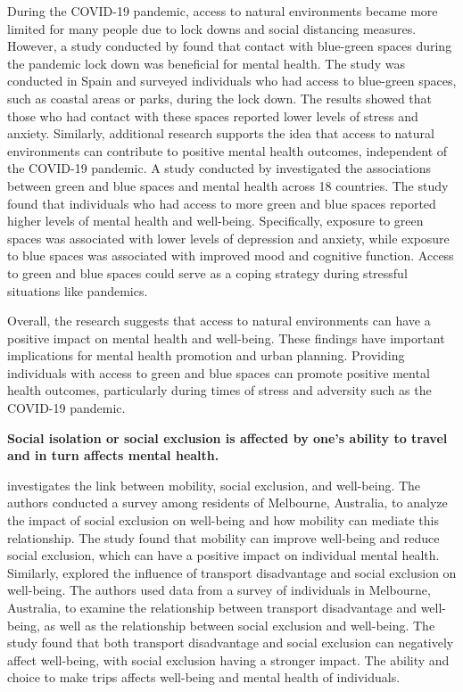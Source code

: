 \documentclass[
  letterpaper,
  authoryear]{elsarticle}
\begin{document}
During the COVID-19 pandemic, access to natural environments became more
limited for many people due to lock downs and social distancing
measures. However, a study conducted by \citet{pouso2021} found that
contact with blue-green spaces during the pandemic lock down was
beneficial for mental health. The study was conducted in Spain and
surveyed individuals who had access to blue-green spaces, such as
coastal areas or parks, during the lock down. The results showed that
those who had contact with these spaces reported lower levels of stress
and anxiety. Similarly, additional research supports the idea that
access to natural environments can contribute to positive mental health
outcomes, independent of the COVID-19 pandemic. A study conducted by
\citet{white2021} investigated the associations between green and blue
spaces and mental health across 18 countries. The study found that
individuals who had access to more green and blue spaces reported higher
levels of mental health and well-being. Specifically, exposure to green
spaces was associated with lower levels of depression and anxiety, while
exposure to blue spaces was associated with improved mood and cognitive
function. Access to green and blue spaces could serve as a coping
strategy during stressful situations like pandemics.

Overall, the research suggests that access to natural environments can
have a positive impact on mental health and well-being. These findings
have important implications for mental health promotion and urban
planning. Providing individuals with access to green and blue spaces can
promote positive mental health outcomes, particularly during times of
stress and adversity such as the COVID-19 pandemic.

\textbf{Social isolation or social exclusion is affected by one's
ability to travel and in turn affects mental health.}

\citet{stanley2011} investigates the link between mobility, social
exclusion, and well-being. The authors conducted a survey among
residents of Melbourne, Australia, to analyze the impact of social
exclusion on well-being and how mobility can mediate this relationship.
The study found that mobility can improve well-being and reduce social
exclusion, which can have a positive impact on individual mental health.
Similarly, \citet{delbosc2011} explored the influence of transport
disadvantage and social exclusion on well-being. The authors used data
from a survey of individuals in Melbourne, Australia, to examine the
relationship between transport disadvantage and well-being, as well as
the relationship between social exclusion and well-being. The study
found that both transport disadvantage and social exclusion can
negatively affect well-being, with social exclusion having a stronger
impact. The ability and choice to make trips affects well-being and
mental health of individuals.
\end{document}
